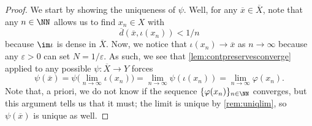 \documentclass[../notes.tex]{subfiles}
\begin{document}
\begin{proof}
	We start by showing the uniqueness of $\psi$. Well, for any $\overline x\in\overline X$, note that any $n\in\NN$ allows us to find $x_n\in X$ with
	\[\overline d(\overline x,\iota(x_n))<1/n\]
	because $\im\iota$ is dense in $\overline X$. Now, we notice that $\iota(x_n)\to\overline x$ as $n\to\infty$ because any $\varepsilon>0$ can set $N=1/\varepsilon$. As such, we see that \autoref{lem:contpreservesconverge} applied to any possible $\psi\colon\overline X\to Y$ forces
	\[\psi(\overline x)=\psi\Big(\lim_{n\to\infty}\iota(x_n)\Big)=\lim_{n\to\infty}\psi(\iota(x_n))=\lim_{n\to\infty}\varphi(x_n).\]
	Note that, a priori, we do not know if the sequence $\{\varphi(x_n)\}_{n\in\NN}$ converges, but this argument tells us that it must; the limit is unique by \autoref{rem:uniqlim}, so $\psi(\overline x)$ is unique as well.


\end{proof}
\end{document}
